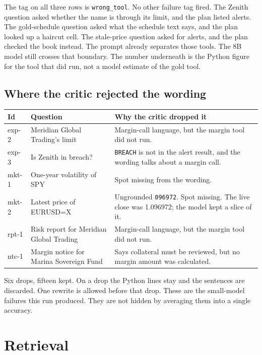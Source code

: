 \documentclass[11pt,a4paper]{article}
\begin{document}
The tag on all three rows is \texttt{wrong\_tool}. No other failure tag fired. The Zenith question asked whether the name is through its limit, and the plan listed alerts. The gold-schedule question asked what the schedule text says, and the plan looked up a haircut cell. The stale-price question asked for alerts, and the plan checked the book instead. The prompt already separates those tools. The 8B model still crosses that boundary. The number underneath is the Python figure for the tool that did run, not a model estimate of the gold tool.

\subsection{Where the critic rejected the wording}

\begin{center}
\small
\begin{tabular}{@{}l>{\raggedright\arraybackslash}p{4.6cm}>{\raggedright\arraybackslash}p{7.6cm}@{}}
\toprule
Id & Question & Why the critic dropped it \\
\midrule
exp-2 & Meridian Global Trading's limit & Margin-call language, but the margin tool did not run. \\
exp-3 & Is Zenith in breach? & \texttt{BREACH} is not in the alert result, and the wording talks about a margin call. \\
mkt-1 & One-year volatility of SPY & Spot missing from the wording. \\
mkt-2 & Latest price of EURUSD=X & Ungrounded \texttt{096972}. Spot missing. The live close was 1.096972; the model kept a slice of it. \\
rpt-1 & Risk report for Meridian Global Trading & Margin-call language, but the margin tool did not run. \\
ntc-1 & Margin notice for Marina Sovereign Fund & Says collateral must be reviewed, but no margin amount was calculated. \\
\bottomrule
\end{tabular}
\end{center}

Six drops, fifteen kept. On a drop the Python lines stay and the sentences are discarded. One rewrite is allowed before that drop. These are the small-model failures this run produced. They are not hidden by averaging them into a single accuracy.

\section{Retrieval}
\end{document}

